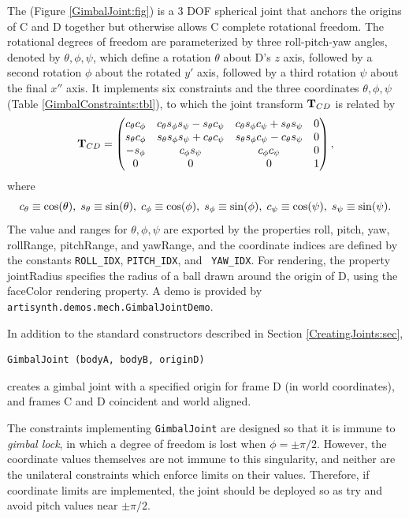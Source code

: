 The 
(Figure \ref{GimbalJoint:fig}) is a 3 DOF spherical joint that anchors
the origins of C and D together but otherwise allows C complete
rotational freedom. The rotational degrees of freedom are
parameterized by three roll-pitch-yaw angles, denoted by
$\theta, \phi, \psi$, which define a rotation $\theta$ about D's $z$
axis, followed by a second rotation $\phi$ about the rotated $y'$
axis, followed by a third rotation $\psi$ about the final $x''$ axis.
It implements six constraints and the three coordinates
$\theta, \phi, \psi$ (Table \ref{GimbalConstraints:tbl}), to which the
joint transform ${\bf T}_{CD}$ is related by
%
\begin{equation*}
{\bf T}_{CD} = \left(\begin{matrix}
c_\theta c_\phi & c_\theta s_\phi s_\psi - s_\theta c_\psi & c_\theta s_\phi c_\psi + s_\theta s_\psi & 0 \\
s_\theta c_\phi & s_\theta s_\phi s_\psi + c_\theta c_\psi & s_\theta s_\phi c_\psi - c_\theta s_\psi & 0 \\
-s_\phi & c_\phi s_\psi & c_\phi c_\psi & 0 \\
0 & 0 & 0 & 1 
\end{matrix}\right),
\end{equation*}
where 
%
\begin{equation*}
c_\theta \equiv \cos(\theta),\;
s_\theta \equiv \sin(\theta),\;
c_\phi \equiv \cos(\phi),\;
s_\phi \equiv \sin(\phi),\;
c_\psi \equiv \cos(\psi),\;
s_\psi \equiv \sin(\psi).
\end{equation*}
%
The value and ranges for $\theta, \phi, \psi$ are exported by the
properties {\sf roll}, {\sf pitch}, {\sf yaw}, {\sf rollRange}, {\sf
pitchRange}, and {\sf yawRange}, and the coordinate indices are
defined by the constants {\tt ROLL\_IDX}, {\tt PITCH\_IDX}, and {\tt
YAW\_IDX}. For rendering, the property {\sf jointRadius} specifies the
radius of a ball drawn around the origin of D, using the {\sf
faceColor} rendering property.  A demo is provided by {\tt
artisynth.demos.mech.GimbalJointDemo}.

In addition to the standard constructors described in
Section \ref{CreatingJoints:sec},
%
\begin{lstlisting}[]
  GimbalJoint (bodyA, bodyB, originD)
\end{lstlisting}
%
creates a gimbal joint with a specified origin for frame D (in world
coordinates), and frames C and D coincident and world aligned.

\begin{sideblock}
The constraints implementing {\tt GimbalJoint} are designed so that it
is immune to {\it gimbal lock}, in which a degree of freedom is lost
when $\phi = \pm \pi/2$. However, the coordinate values themselves are
not immune to this singularity, and neither are the unilateral
constraints which enforce limits on their values. Therefore, if
coordinate limits are implemented, the joint should be deployed so as try
and avoid pitch values near $\pm \pi/2$.
\end{sideblock}

